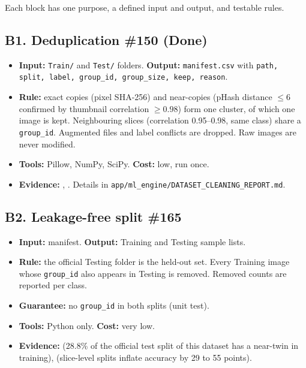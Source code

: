 \documentclass[11pt,a4paper]{article}
\newcommand{\board}[1]{\textsf{\##1}}
\begin{document}
Each block has one purpose, a defined input and output, and testable rules.

\subsection*{B1. Deduplication \hfill \board{150} (Done)}
\begin{itemize}
  \item \textbf{Input:} \texttt{Train/} and \texttt{Test/} folders. \textbf{Output:} \texttt{manifest.csv} with \texttt{path, split, label, group\_id, group\_size, keep, reason}.
  \item \textbf{Rule:} exact copies (pixel SHA-256) and near-copies (pHash distance $\le 6$ confirmed by thumbnail correlation $\ge 0.98$) form one cluster, of which one image is kept. Neighbouring slices (correlation 0.95--0.98, same class) share a \texttt{group\_id}. Augmented files and label conflicts are dropped. Raw images are never modified.
  \item \textbf{Tools:} Pillow, NumPy, SciPy. \textbf{Cost:} low, run once.
  \item \textbf{Evidence:} \cite{r1}, \cite{r2}. Details in \texttt{app/ml\_engine/DATASET\_CLEANING\_REPORT.md}.
\end{itemize}

\subsection*{B2. Leakage-free split \hfill \board{165}}
\begin{itemize}
  \item \textbf{Input:} manifest. \textbf{Output:} Training and Testing sample lists.
  \item \textbf{Rule:} the official Testing folder is the held-out set. Every Training image whose \texttt{group\_id} also appears in Testing is removed. Removed counts are reported per class.
  \item \textbf{Guarantee:} no \texttt{group\_id} in both splits (unit test).
  \item \textbf{Tools:} Python only. \textbf{Cost:} very low.
  \item \textbf{Evidence:} \cite{r1} (28.8\% of the official test split of this dataset has a near-twin in training), \cite{r3} (slice-level splits inflate accuracy by 29 to 55 points).
\end{itemize}
\end{document}
